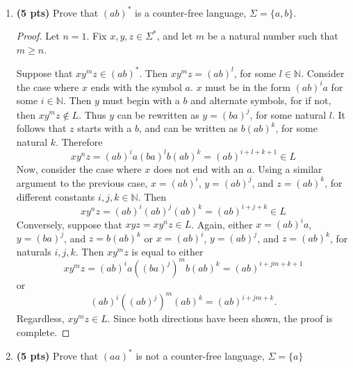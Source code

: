 \documentclass[11pt]{article}
\begin{document}
\begin{enumerate}[label=\textbf{Q\arabic*.}]
\begin{enumerate}[label=\textit{\alph*)}]
\begin{proof}
		If \(|w| > 0\), note the following observations:

		\(w\) must start with an \(a\), because if not then \(w \in \{b\}\Sigma ^*\).

		Also, \(w\) must alternate. Otherwise, \(w \in \overline{\Sigma ^* \{bb\}\Sigma ^*}\) or \(w \in \overline{\Sigma ^* \{aa\} \Sigma ^*}\).

		Finally, \(w\) must end in a \(b\) because \(w \in \overline{\Sigma ^*\{a\}}\).

		This means that \(w = ab...ab\). It is obvious that \(w = (ab)^n\) for some \(n \in \mathbb{N}^+\). Thus \(w \in (ab)*\), proving that \((ab)^*\) can be matched by a star-free expression.
		\smallbreak
	\end{proof}

	\item \textbf{(5 pts)} Prove that $(ab)^*$ is a counter-free language,  $\Sigma = \{a,b\}$.
	
	\begin{proof}
		Let \(n = 1\). Fix \(x,y,z \in \Sigma ^*\), and let \(m\) be a natural number such that \(m \geq n\).

		Suppose that \(xy^m z \in (ab)^*\). Then \(xy^m z = (ab)^l\), for some \(l \in \mathbb{N}\). Consider the case where \(x\) ends with the symbol \(a\). \(x\) must be in the form \((ab)^i a\) for some \(i \in \mathbb{N}\). Then \(y\) must begin with a \(b\) and alternate symbols, for if not, then \(xy^m z \notin L\). Thus \(y\) can be rewritten as \(y = (ba)^j\), for some natural \(l\). It follows that \(z\) starts with a \(b\), and can be written as \(b(ab)^k\), for some natural \(k\). Therefore
		\[
			xy^n z = (ab)^i a (ba)^l b (ab)^k = (ab)^{i+l+k+1} \in L
		\]
		Now, consider the case where \(x\) does not end with an \(a\). Using a similar argument to the previous case, \(x = (ab)^i\), \(y = (ab)^j\), and \(z = (ab)^k\), for different constants \(i,j,k \in \mathbb{N}\). Then
		\[
			xy^n z = (ab)^i (ab)^j (ab)^k = (ab)^{i+j+k} \in L
		\]
		Conversely, suppose that \(xyz = xy^n z \in L\). Again, either \(x = (ab)^i a\), \(y = (ba)^j\), and \(z = b(ab)^k\) or \(x = (ab)^i\), \(y = (ab)^j\), and \(z = (ab)^k\), for naturals \(i,j,k\). Then \(xy^m z\) is equal to either
		\[
			xy^m z = (ab)^i a ((ba)^j)^m b(ab)^k = (ab)^{i+jm+k+1}
		\]
		or
		\[
			(ab)^i ((ab)^j)^m (ab)^k = (ab)^{i+jm+k} \text{.} 
		\]
		Regardless, \(xy^m z \in L\). Since both directions have been shown, the proof is complete.
		
	\end{proof}
	\item \textbf{(5 pts)} Prove that  $(aa)^*$ is not a counter-free language, $\Sigma = \{a\}$
	

\end{enumerate}
\end{enumerate}
\end{document}
